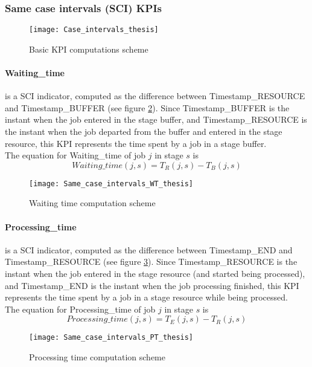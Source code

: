 \subsubsection{Same case intervals (SCI) KPIs}
\begin{figure}[H] 
\centering    
\texttt{[image: Case\_intervals\_thesis]}
\caption[Basic KPI computations scheme]{Basic KPI computations scheme}
\label{fig:Basic KPIs scheme}
\end{figure}
\paragraph{Waiting\_time} is a SCI indicator, computed as the difference between Timestamp\_RESOURCE and Timestamp\_BUFFER (see figure \ref{fig:Waiting time scheme}). Since Timestamp\_BUFFER is the instant when the job entered in the stage buffer, and Timestamp\_RESOURCE  is the instant when the job departed from the buffer and entered in the stage resource, this KPI represents the time spent by a job in a stage buffer. \\
The equation for Waiting\_time of job $j$ in stage $s$ is
\[Waiting\_time(j,s)=T_R(j,s)-T_B(j,s)\]
\begin{figure}[H] 
\centering    
\texttt{[image: Same\_case\_intervals\_WT\_thesis]}
\caption[Waiting time computation scheme]{Waiting time computation scheme}
\label{fig:Waiting time scheme}
\end{figure}
\paragraph{Processing\_time} is a SCI indicator, computed as the difference between Timestamp\_END and Timestamp\_RESOURCE (see figure \ref{fig:Processing time scheme}). Since Timestamp\_RESOURCE is the instant when the job entered in the stage resource (and started being processed), and Timestamp\_END is the instant when the job processing finished, this KPI represents the time spent by a job in a stage resource while being processed. \\
The equation for Processing\_time of job $j$ in stage $s$ is
\[Processing\_time(j,s)=T_E(j,s)-T_R(j,s)\]
\begin{figure}[H] 
\centering    
\texttt{[image: Same\_case\_intervals\_PT\_thesis]}
\caption[Processing time computation scheme]{Processing time computation scheme}
\label{fig:Processing time scheme}
\end{figure}
